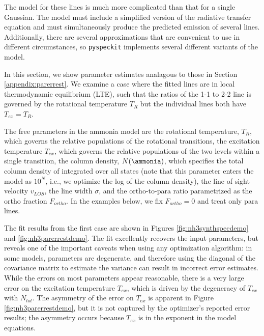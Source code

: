 \documentclass[twocolumn]{aastex62}
\newcommand{\pyspeckit}{\texttt{pyspeckit}\xspace}
\begin{document}
The model for these lines is much more complicated than that for a single Gaussian.
The model must include a simplified version of the radiative transfer equation
and must simultaneously produce the predicted emission of several lines.
Additionally, there are several approximations that are convenient to use
in different circumstances, so \pyspeckit implements several different
variants of the \ammonia model.

In this section, we show parameter estimates analagous to those in Section
\ref{appendix:parerrest}.
We examine a case where the fitted lines are in local
thermodynamic equilibrium (LTE), such that the ratios of the 1-1
to 2-2 line is governed by the rotational temperature $T_{R}$ but the individual
lines both have $T_{ex}=T_{R}$.

The free parameters in the ammonia model are
the rotational temperature, $T_{R}$, which governs the relative populations
of the rotational transitions, the excitation temperature $T_{ex}$, which governs
the relative populations of the two levels within a single transition,
the column density, $N(\ammonia)$, which specifies the total column density
of \ammonia integrated over all states (note that this parameter enters
the model as $10^N$, i.e., we optimize the log of the column density),
the line of sight velocity $v_{LOS}$, the line width $\sigma$, and the ortho-to-para
ratio parametrized as the ortho fraction $F_{ortho}$.  In the examples below,
we fix $F_{ortho}=0$ and treat only para lines.


The fit results from the first case are shown in Figures
\ref{fig:nh3synthspecdemo} and \ref{fig:nh3parerrestdemo}.  The fit excellently
recovers the input parameters, but reveals one of the important caveats when
using any optimization algorithm: in some models, parameters are degenerate,
and therefore using the diagonal of the covariance matrix to estimate the
variance can result in incorrect error estimates.  While the errors on most
parameters appear reasonable, there is a very large error on the excitation
temperature $T_{ex}$, which is driven by the degeneracy of $T_{ex}$ with
$N_{tot}$.  The asymmetry of the error on $T_{ex}$ is apparent in Figure
\ref{fig:nh3parerrestdemo}, but it is not captured by the optimizer's reported
error results; the asymmetry occurs because $T_{ex}$ is in the exponent in the
model equations.
\end{document}
